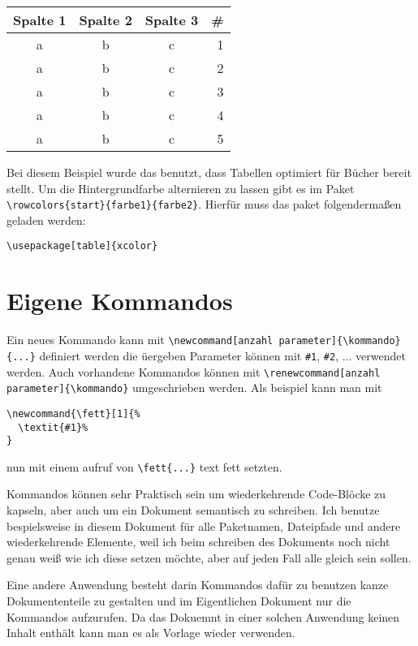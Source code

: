 \begin{center}
  {
    \begin{tabular}{c c c r}\\\toprule
      Spalte 1 & Spalte 2 & Spalte 3 & \# \\\midrule
      a & b & c & 1\\
      a & b & c & 2\\
      a & b & c & 3\\
      a & b & c & 4\\
      a & b & c & 5\\\bottomrule
    \end{tabular}
  }
\end{center}

Bei diesem Beispiel wurde das  benutzt, dass Tabellen optimiert für Bücher bereit stellt. Um
die Hintergrundfarbe alternieren zu lassen gibt es im  Paket
\verb+\rowcolors{start}{farbe1}{farbe2}+. Hierfür muss das paket folgendermaßen geladen werden:
\begin{verbatim}
\usepackage[table]{xcolor}
\end{verbatim}

\section{Eigene Kommandos}\label{sec:customCommands}
Ein neues Kommando kann mit \verb+\newcommand[anzahl parameter]{\kommando}{...}+ definiert werden
die üergeben Parameter können mit \verb+#1+, \verb+#2+, ... verwendet werden. Auch vorhandene Kommandos
können mit \verb+\renewcommand[anzahl parameter]{\kommando}+ umgeschrieben werden. Als beispiel kann man mit
\begin{verbatim}
\newcommand{\fett}[1]{%
  \textit{#1}%
}
\end{verbatim}
nun mit einem aufruf von \verb+\fett{...}+ text fett setzten.

Kommandos können sehr Praktisch sein um wiederkehrende Code-Blöcke zu kapseln, aber auch um ein Dokument
semantisch zu schreiben. Ich benutze bespielsweise in diesem Dokument für alle Paketnamen, Dateipfade und
andere wiederkehrende Elemente, weil ich beim schreiben des Dokuments noch nicht genau weiß wie ich diese
setzen möchte, aber auf jeden Fall alle gleich sein sollen. 

Eine andere Anwendung besteht darin Kommandos dafür zu benutzen kanze Dokumententeile zu gestalten und im
Eigentlichen Dokument nur die Kommandos aufzurufen. Da das Dokuemnt in einer solchen Anwendung keinen Inhalt
enthält kann man es als Vorlage wieder verwenden. 

